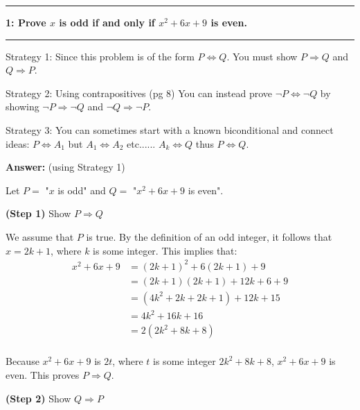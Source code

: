 \documentclass[11pt]{article}
\newcommand\question[2]{\vspace{.25in}\hrule\textbf{#1: #2}\vspace{.5em}\hrule\vspace{.10in}}
\renewcommand\part[1]{\vspace{.10in}\textbf{(#1)}}
\newcommand\answer{\vspace{.10in}\textbf{Answer: }}
\begin{document}
\raggedright
\newcommand\NAME{Stewart Dulaney}  %
\newcommand\SID{1545566}     %
\newcommand\HWNUM{2}              %

\question{1}{Prove $x$ is odd if and only if $x^2 + 6x + 9$ is even.} 

Strategy 1:  Since this problem is of the form $P \Leftrightarrow Q$. You must show $P \Rightarrow Q$ and $Q \Rightarrow P$.

Strategy 2:  Using contrapositives (pg 8) You can instead prove $\lnot P \Leftrightarrow \lnot Q$ by showing $\lnot P \Rightarrow \lnot Q$ and $\lnot Q \Rightarrow \lnot P$.

Strategy 3:  You can sometimes start with a known biconditional and connect ideas: $P \Leftrightarrow A_1$ but $A_1 \Leftrightarrow A_2$ etc...... $A_k \Leftrightarrow Q$ thus $P \Leftrightarrow Q$.

\answer (using Strategy 1)

Let $P =$ "$x$ is odd" and $Q =$ "$x^2 + 6x + 9$ is even".

\part{Step 1} Show $P \Rightarrow Q$

We assume that $P$ is true. By the definition of an odd integer, it follows that $x = 2k + 1$, where $k$ is some integer.
This implies that:\\
\begin{align*}
  x^2 + 6x + 9 &= (2k + 1)^2 + 6(2k + 1) + 9 \\
  &= (2k + 1)(2k + 1) + 12k + 6 + 9 \\
  &= (4k^2 + 2k + 2k + 1) + 12k + 15 \\
  &= 4k^2 + 16k + 16 \\
  &= 2(2k^2 + 8k + 8) \\
\end{align*}

Because $x^2 + 6x + 9$ is $2t$, where $t$ is some integer $2k^2 + 8k + 8$, $x^2 + 6x + 9$ is even. This proves $P \Rightarrow Q$.

\part{Step 2} Show $Q \Rightarrow P$
\end{document}
